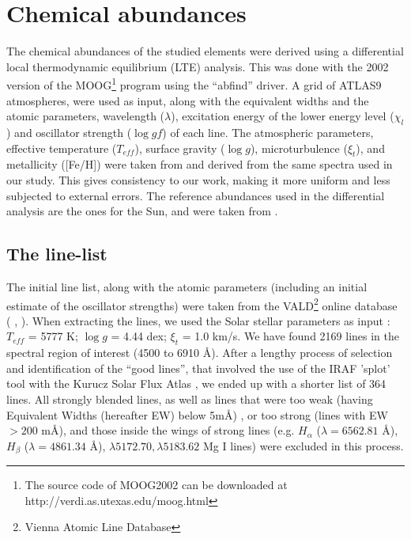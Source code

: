 \documentclass[oldversion]{aa}
\begin{document}
\section{Chemical abundances}
\label{sec:chemical}

The chemical abundances of the studied elements were derived using a differential local thermodynamic equilibrium (LTE) analysis. This was done with the 2002 version of the MOOG\footnote{The source code of MOOG2002 can be downloaded at http://verdi.as.utexas.edu/moog.html} program \citep{Sneden-1973} using the ``abfind'' driver. A grid of \citet{Kurucz-1993} ATLAS9 atmospheres, were used as input, along with the equivalent widths and the atomic parameters, wavelength ($\lambda$), excitation energy of the lower energy level ($\chi_l$) and oscillator strength ($\log gf$) of each line. The atmospheric parameters, effective temperature ($T_{eff}$), surface gravity ($\log g$), microturbulence ($\xi_t$), and metallicity ([Fe/H]) 
were taken from \citet{Sousa-2008} and derived from the same spectra used in our study. This gives consistency to our work, making it more uniform and less subjected to external errors. The reference abundances used in the differential analysis are the ones for the Sun, and were taken from \citet{Anders-1989}.




\subsection{The line-list}
\label{sec:linelist}



The initial line list, along with the atomic parameters (including an initial estimate of the oscillator strengths) were taken from the VALD\footnote{Vienna Atomic Line Database} online database (\citeauthor{Piskunov-1995} \citeyear{Piskunov-1995}, \citeauthor{Kupka-1999} \citeyear{Kupka-1999}). When extracting the lines, we used the Solar stellar parameters as input : $T_{eff}$ = 5777 K; $\log g$ = 4.44 dex; $\xi_t$ = 1.0 km/s. %
We have found 2169 lines in the spectral region of interest (4500 to 6910 \AA). After a lengthy process of selection and identification of the ``good lines'', that involved the use of the IRAF 'splot' tool with the Kurucz Solar Flux Atlas \citep{Kurucz-1984}, we ended up with a shorter list of 364 lines. All strongly blended lines, as well as lines that were too weak (having Equivalent Widths (hereafter EW) below 5m\AA) , or too strong (lines with EW $>200$ m\AA), and those inside the wings of strong lines (e.g. $H_\alpha$ ($\lambda=6562.81$ \AA), $H_\beta$ ($\lambda=4861.34$ \AA), $\lambda5172.70,\lambda5183.62$ Mg I lines) were excluded in this process. %
\end{document}
